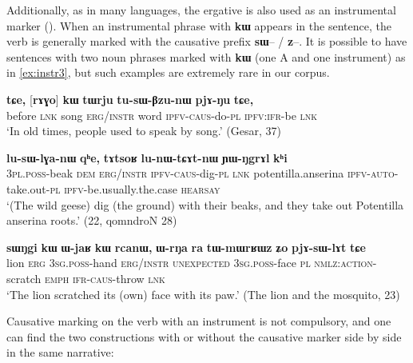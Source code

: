 \documentclass[oldfontcommands,oneside,a4paper,11pt]{article}
\newcommand{\ipa}[1]{{\phon\textbf{#1}}}
\begin{document}
Additionally, as in many languages, the ergative is also used as an instrumental marker (\citealt[32]{agent02palancar}). When an  instrumental phrase with \ipa{kɯ}  appears in the sentence, the verb is generally marked with the causative prefix \ipa{sɯ}-- / \ipa{z}--. It is possible  to have sentences with two noun phrases marked with \ipa{kɯ} (one A and one instrument) as in \ref{ex:instr3}, but such examples are extremely rare in our corpus.

 \begin{exe}
\ex \label{ex:instr}
\gll \ipa{kɯɕɯŋgɯ}   	\ipa{tɕe,}   	[\ipa{rɤɣo}]   	\ipa{\textbf{kɯ}}   	\ipa{tɯrju}   	\ipa{tu-sɯ-βzu-nɯ}   	\ipa{pjɤ-ŋu}   	\ipa{tɕe,}     \\
before \textsc{lnk} song \textsc{erg/instr} word \textsc{ipfv}-\textsc{caus}-do-\textsc{pl} \textsc{ipfv:ifr}-be \textsc{lnk}\\
\glt  `In old times, people used to speak by song.' (Gesar, 37)
\end{exe}
 \begin{exe}
\ex \label{ex:instr2}
\gll [\ipa{nɯ-mtsioʁ}   	\ipa{nɯ}]   	\ipa{\textbf{kɯ}}   	\ipa{lu-sɯ-lɣa-nɯ}   	\ipa{qʰe,}   	\ipa{tɤtsoʁ}   	\ipa{lu-nɯ-tɕɤt-nɯ}   	\ipa{ɲɯ-ŋgrɤl}   	\ipa{kʰi}        \\
\textsc{3pl.poss}-beak \textsc{dem} \textsc{erg/instr} \textsc{ipfv-caus}-dig-\textsc{pl} \textsc{lnk} potentilla.anserina \textsc{ipfv-auto}-take.out-\textsc{pl} \textsc{ipfv}-be.usually.the.case \textsc{hearsay} \\
\glt  `(The wild geese) dig (the ground) with their beaks, and they take out Potentilla anserina roots.' (22, qomndroN 28)
\end{exe}

\begin{exe}
\ex \label{ex:instr3}
\gll
 \ipa{sɯŋgi} 	\ipa{kɯ} 	\ipa{ɯ-jaʁ} 	\ipa{kɯ} 	\ipa{rcanɯ,} 	\ipa{ɯ-rŋa} 	\ipa{ra} 	\ipa{tɯ-mɯrʁɯz} 	\ipa{ʑo} 	\ipa{pjɤ-sɯ-lɤt} 	\ipa{tɕe} \\
 lion \textsc{erg} \textsc{3sg.poss}-hand \textsc{erg/instr} \textsc{unexpected} \textsc{3sg.poss}-face \textsc{pl} \textsc{nmlz:action}-scratch \textsc{emph} \textsc{ifr-caus}-throw \textsc{lnk}\\
\glt `The lion scratched its (own) face with its paw.' (The lion and the mosquito, 23)
\end{exe}
Causative marking on the verb with an instrument is not compulsory, and one can find the two constructions with or without the causative marker side by side in the same narrative:
\end{document}
